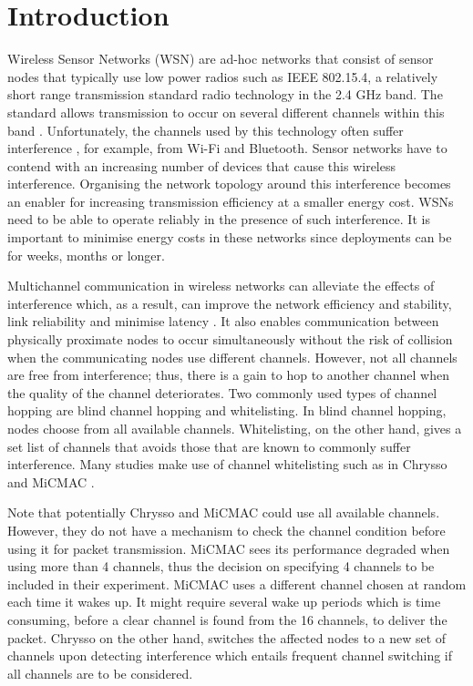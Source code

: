 \section{Introduction}
\label{sec:introduction}
Wireless Sensor Networks (WSN) are ad-hoc networks that consist of sensor nodes that typically use low power radios such as IEEE 802.15.4, a relatively short range transmission standard radio technology in the 2.4 GHz band. The standard allows transmission to occur on several different channels within this band \cite{ieee802.15.4}. Unfortunately, the channels used by this technology often suffer interference \cite{Boano:2010:MSM:2127940.2127963, ieeeCompare}, for example, from Wi-Fi \cite{ieee_2012, wu} and Bluetooth. Sensor networks have to contend with an increasing number of devices that cause this wireless interference. Organising the network topology around this interference becomes an enabler for increasing transmission efficiency at a smaller energy cost. WSNs need to be able to operate reliably in the presence of such interference. It is important to minimise energy costs in these networks since deployments can be for weeks, months or longer.

Multichannel communication in wireless networks can alleviate the effects of interference which, as a result, can improve the network efficiency and stability, link reliability and minimise latency \cite{watteyne}. It also enables communication between physically proximate nodes to occur simultaneously without the risk of collision when the communicating nodes use different channels. However, not all channels are free from interference; thus, there is a gain to hop to another channel when the quality of the channel deteriorates. Two commonly used types of channel hopping \cite{watteyne} are blind channel hopping and whitelisting. In blind channel hopping, nodes choose from all available channels. 
Whitelisting, on the other hand, gives a set list of channels that avoids those that are known to commonly suffer interference.
Many studies make use of channel whitelisting such as in Chrysso \cite{chrysso} and MiCMAC \cite{micmac}.

Note that potentially Chrysso and MiCMAC could use all available channels.
However, they do not have a mechanism to check the channel condition before using it for packet transmission. MiCMAC sees its performance degraded when using more than 4 channels, thus the decision on specifying 4 channels to be included in their experiment. 
MiCMAC uses a different channel chosen at random each time it wakes up.
It might require several wake up periods which is time consuming, before a clear channel is found from the 16 channels, to deliver the packet.  
Chrysso on the other hand, switches the affected nodes to a new set of channels upon detecting interference which entails frequent channel switching if all channels are to be considered.


